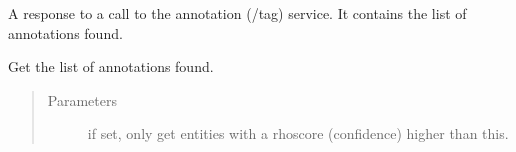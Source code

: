 \documentclass[letterpaper,10pt,english]{sphinxmanual}
\begin{document}
\begin{fulllineitems}
\label{\detokenize{code_comment/tweet_processor:hate_tweet_map.tweets_processor.MyTagMe.AnnotateResponse}}
\sphinxAtStartPar
A response to a call to the annotation (/tag) service. It contains the list of annotations
found.

\begin{fulllineitems}
\label{\detokenize{code_comment/tweet_processor:hate_tweet_map.tweets_processor.MyTagMe.AnnotateResponse.get_annotations}}
\sphinxAtStartPar
Get the list of annotations found.
\begin{quote}\begin{description}
\item[{Parameters}] \leavevmode
\sphinxAtStartPar
{} \textendash{} if set, only get entities with a rho\sphinxhyphen{}score (confidence) higher than this.

\end{description}\end{quote}

\end{fulllineitems}


\end{fulllineitems}

\end{document}
